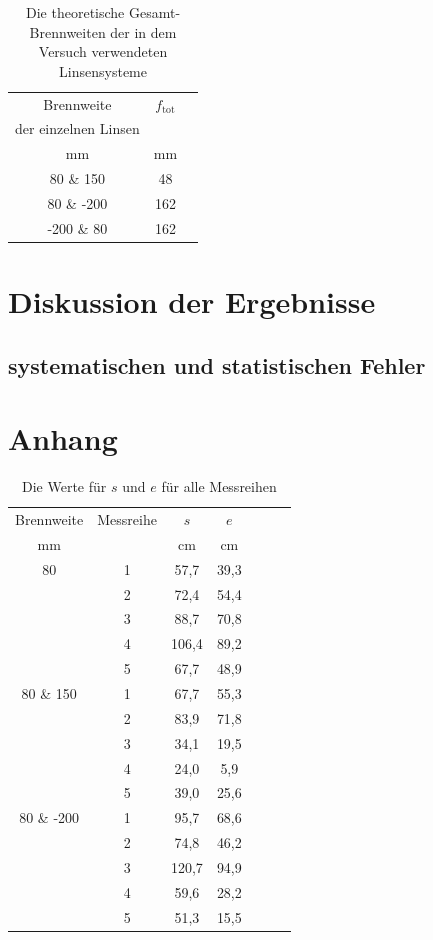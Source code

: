 \documentclass[11pt,a4paper]{article}
\begin{document}
\begin{table}[h]
	\centering
	\begin{tabular*}{0.75\textwidth}{@{\extracolsep{\fill}}c|cc}
		\toprule
		Brennweite & $f_\textrm{tot}$  \\
		der einzelnen Linsen &\\
		mm & mm \\
		80 \& 150  & 48  \\
		80 \& -200 & 162 \\
		-200 \& 80 & 162 \\
		\bottomrule
	\end{tabular*}
	\caption{Die theoretische Gesamt-Brennweiten der in dem Versuch verwendeten Linsensysteme}
\end{table}

\section{Diskussion der Ergebnisse}
\subsection{systematischen und statistischen Fehler}

\section{Anhang}


\begin{table}[h]
	\centering
	\begin{tabular*}{0.50\textwidth}{@{\extracolsep{\fill}}cc|ccccc}
		\toprule
		Brennweite & Messreihe & $s$ & $e$   \\
		mm &  & cm & cm  \\
		\bottomrule
		80 & 1 & 57,7 & 39,3 \\
		& 2 & 72,4 & 54,4 \\
		& 3 & 88,7 & 70,8 \\
		& 4 & 106,4 & 89,2 \\
		& 5 & 67,7 & 48,9 \\
		80 \& 150 & 1 & 67,7 & 55,3 \\
		& 2 & 83,9 & 71,8 \\
		& 3 & 34,1 & 19,5 \\
		& 4 & 24,0 & 5,9 \\
		& 5 & 39,0 & 25,6 \\
		80 \& -200 & 1 & 95,7 & 68,6 \\
		& 2 & 74,8 & 46,2 \\
		& 3 & 120,7 & 94,9 \\
		& 4 & 59,6 & 28,2 \\
		& 5 & 51,3 & 15,5 \\
		\bottomrule
	\end{tabular*}
	\caption{Die Werte für $s$ und $e$ für alle Messreihen}
\end{table}
\end{document}
